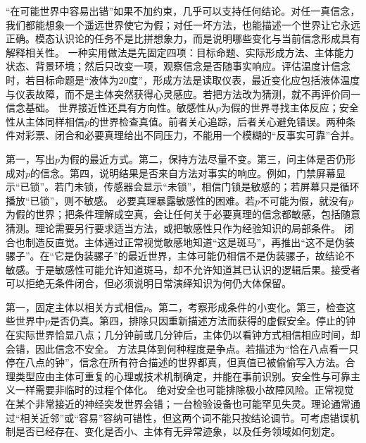  “在可能世界中容易出错”如果不加约束，几乎可以支持任何结论。对任一真信念，我们都能想象一个遥远世界使它为假；对任一坏方法，也能描述一个世界让它永远正确。模态认识论的任务不是比拼想象力，而是说明哪些变化与当前信念形成具有解释相关性。 一种实用做法是先固定四项：目标命题、实际形成方法、主体能力状态、背景环境；然后只改变一项，观察信念是否随事实响应。评估温度计信念时，若目标命题是“液体为20度”，形成方法是读取仪表，最近变化应包括液体温度与仪表故障，而不是主体突然获得心灵感应。若把方法改为猜测，就不再评价同一信念基础。 世界接近性还具有方向性。敏感性从$p$为假的世界寻找主体反应；安全性从主体同样相信$p$的世界检查真值。前者关心追踪，后者关心避免错误。两种条件对彩票、闭合和必要真理给出不同压力，不能用一个模糊的“反事实可靠”合并。

第一，写出$p$为假的最近方式。第二，保持方法尽量不变。第三，问主体是否仍形成对$p$的信念。第四，说明结果是否来自方法对事实的响应。例如，门禁屏幕显示“已锁”。若门未锁，传感器会显示“未锁”，相信门锁是敏感的；若屏幕只是循环播放“已锁”，则不敏感。 必要真理暴露敏感性的困难。若$p$不可能为假，就没有$p$为假的世界；把条件理解成空真，会让任何关于必要真理的信念都敏感，包括随意猜测。理论需要另行要求适当方法，或把敏感性只作为经验知识的局部条件。 闭合也制造反直觉。主体通过正常视觉敏感地知道“这是斑马”，再推出“这不是伪装骡子”。在“它是伪装骡子”的最近世界，主体可能仍相信不是伪装骡子，故结论不敏感。于是敏感性可能允许知道斑马，却不允许知道其已认识的逻辑后果。接受者可以拒绝无条件闭合，但必须说明日常演绎知识为何仍大体保留。

第一，固定主体以相关方式相信$p$。第二，考察形成条件的小变化。第三，检查这些世界中$p$是否仍真。第四，排除只因重新描述方法而获得的虚假安全。停止的钟在实际世界恰显八点；几分钟前或几分钟后，主体仍以看钟方式相信相应时间，却会错，因此信念不安全。 方法具体到何种程度是争点。若描述为“恰在八点看一只停在八点的钟”，信念在所有符合描述的世界都真，但真值已被偷偷写入方法。合理类型应由主体可重复的心理或技术机制确定，并能在事前识别。安全性与可靠主义一样需要非临时的过程个体化。 绝对安全也可能排除极小故障风险。正常视觉在某个非常接近的神经突发世界会错；一台检验设备也可能罕见失灵。理论通常通过“相关近邻”或“容易”容纳可错性，但这两个词不能只按结论调节。可考虑错误机制是否已经存在、变化是否小、主体有无异常迹象，以及任务领域如何划定。

